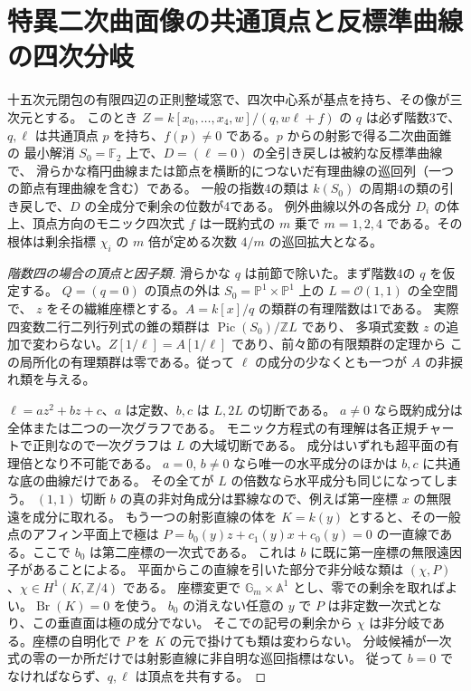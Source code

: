 \section{特異二次曲面像の共通頂点と反標準曲線の四次分岐}
\label{sec:singular-quadric-common-vertex}
\begin{theorem}\label{thm:singular-quadric-common-vertex}
十五次元閉包の有限四辺の正則整域窓で、四次中心系が基点を持ち、その像が三次元とする。
このとき $Z=k[x_0,\ldots,x_4,w]/(q,w\ell+f)$ の $q$ は必ず階数3で、
$q,\ell$ は共通頂点 $p$ を持ち、$f(p)\ne0$ である。$p$ からの射影で得る二次曲面錐の
最小解消 $S_0=\mathbb F_2$ 上で、$D=(\ell=0)$ の全引き戻しは被約な反標準曲線で、
滑らかな楕円曲線または節点を横断的につないだ有理曲線の巡回列（一つの節点有理曲線を含む）である。
一般の指数4の類は $k(S_0)$ の周期4の類の引き戻しで、$D$ の全成分で剰余の位数が4である。
例外曲線以外の各成分 $D_i$ の体上、頂点方向のモニック四次式 $f$ は一既約式の $m$ 乗で
$m=1,2,4$ である。その根体は剰余指標 $\chi_i$ の $m$ 倍が定める次数 $4/m$ の巡回拡大となる。
\end{theorem}
\begin{proof}[階数四の場合の頂点と因子類]
滑らかな $q$ は前節で除いた。まず階数4の $q$ を仮定する。
$Q=(q=0)$ の頂点の外は $S_0=\mathbb P^1\times\mathbb P^1$ 上の $L=\mathcal O(1,1)$ の全空間で、
$z$ をその繊維座標とする。$A=k[x]/q$ の類群の有理階数は1である。
実際四変数二行二列行列式の錐の類群は $\operatorname{Pic}(S_0)/\mathbb Z L$ であり、
多項式変数 $z$ の追加で変わらない。$Z[1/\ell]=A[1/\ell]$ であり、前々節の有限類群の定理から
この局所化の有理類群は零である。従って $\ell$ の成分の少なくとも一つが $A$ の非捩れ類を与える。

$\ell=a z^2+b z+c$、$a$ は定数、$b,c$ は $L,2L$ の切断である。
$a\ne0$ なら既約成分は全体または二つの一次グラフである。
モニック方程式の有理解は各正規チャートで正則なので一次グラフは $L$ の大域切断である。
成分はいずれも超平面の有理倍となり不可能である。
$a=0$, $b\ne0$ なら唯一の水平成分のほかは $b,c$ に共通な底の曲線だけである。
その全てが $L$ の倍数なら水平成分も同じになってしまう。
$(1,1)$ 切断 $b$ の真の非対角成分は罫線なので、例えば第一座標 $x$ の無限遠を成分に取れる。
もう一つの射影直線の体を $K=k(y)$ とすると、その一般点のアフィン平面上で極は
$P=b_0(y)z+c_1(y)x+c_0(y)=0$ の一直線である。ここで $b_0$ は第二座標の一次式である。
これは $b$ に既に第一座標の無限遠因子があることによる。
平面からこの直線を引いた部分で非分岐な類は $(\chi,P)$、$\chi\in H^1(K,\mathbb Z/4)$ である。
座標変更で $\mathbb G_m\times\mathbb A^1$ とし、零での剰余を取ればよい。$\operatorname{Br}(K)=0$ を使う。
$b_0$ の消えない任意の $y$ で $P$ は非定数一次式となり、この垂直面は極の成分でない。
そこでの記号の剰余から $\chi$ は非分岐である。座標の自明化で $P$ を $K$ の元で掛けても類は変わらない。
分岐候補が一次式の零の一か所だけでは射影直線に非自明な巡回指標はない。
従って $b=0$ でなければならず、$q,\ell$ は頂点を共有する。
\end{proof}

